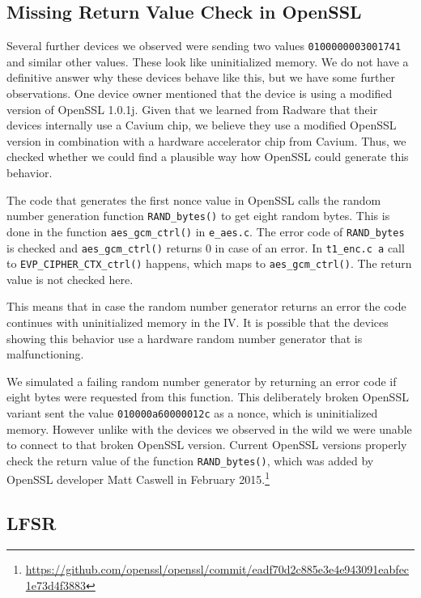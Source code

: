 \documentclass[10pt, a4paper]{article}
\begin{document}
\subsection{Missing Return Value Check in OpenSSL}

Several further devices we observed were sending two values \linebreak \texttt{0100000003001741} and similar other values.
These look like uninitialized memory.
We do not have a definitive answer why these devices behave like this, but we have some further observations.
One device owner mentioned that the device is using a modified version of OpenSSL 1.0.1j. 
Given that we learned from Radware that their devices internally use a Cavium chip, we believe
they use a modified OpenSSL version in combination with a hardware accelerator chip from Cavium.
Thus, we checked whether we could find a plausible way how OpenSSL could generate this behavior.

The code that generates the first nonce value in OpenSSL calls the random number generation function
\texttt{RAND\_bytes()} to get eight random bytes. This is done in the function
\texttt{aes\_gcm\_ctrl()} in \texttt{e\_aes.c}. The error code of \texttt{RAND\_bytes} is checked and
\texttt{aes\_gcm\_ctrl()} returns 0 in case of an error.
In \texttt{t1\_enc.c a} call to \texttt{EVP\_CIPHER\_CTX\_ctrl()} happens, which maps to \texttt{aes\_gcm\_ctrl()}.
The return value is not checked here.

This means that in case the random number generator returns an error the code continues with uninitialized
memory in the IV. It is possible that the devices showing this behavior use a hardware random number generator
that is malfunctioning.

We simulated a failing random number generator by returning an error code if eight bytes
were requested from this function. This deliberately broken OpenSSL variant sent the value
\texttt{010000a60000012c} as a nonce, which is uninitialized memory. However unlike with the devices
we observed in the wild we were unable to connect to that broken OpenSSL version.
Current OpenSSL versions properly check the return value of the function \texttt{RAND\_bytes()}, which was added by
OpenSSL developer Matt Caswell in February 2015.\footnote{\url{https://github.com/openssl/openssl/commit/eadf70d2c885e3e4e943091eabfec1e73d4f3883}}


\subsection{LFSR}
\end{document}
